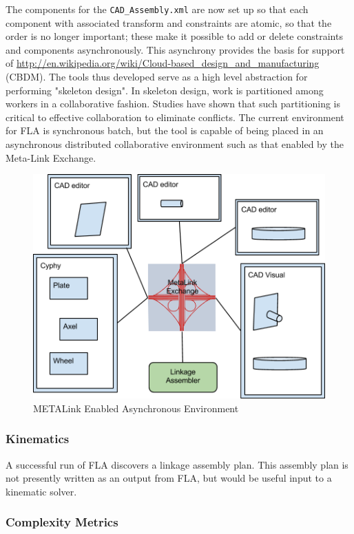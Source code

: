 \documentclass[]{report}
\begin{document}
The components for the \texttt{CAD\_Assembly.xml} are now set up so that each component 
with associated transform and constraints are atomic, so that the order is no longer important; 
these make it possible to add or delete constraints and components asynchronously. 
This asynchrony provides the basis for support of  \url{http://en.wikipedia.org/wiki/Cloud-based_design_and_manufacturing} (CBDM).
The tools thus developed serve as a high level abstraction 
for performing "skeleton design". 
In skeleton design, work is partitioned among workers in a collaborative fashion. 
Studies have shown that such partitioning is critical to effective collaboration to eliminate conflicts.
The current environment for FLA is synchronous batch, but 
the tool is capable of being placed in an asynchronous distributed 
collaborative environment such as that enabled by the Meta-Link Exchange.

\begin{figure}[h!]
	\centering
	\includegraphics[scale=0.7]{images/image08.png}
	\caption{METALink Enabled Asynchronous Environment}
	\label{fig:async-metalink}
\end{figure}

\subsubsection{Kinematics}

A successful run of FLA discovers a linkage assembly plan. 
This assembly plan is not presently written as an output from FLA, 
but would be useful input to a kinematic solver.

\subsubsection{Complexity Metrics}
\end{document}
